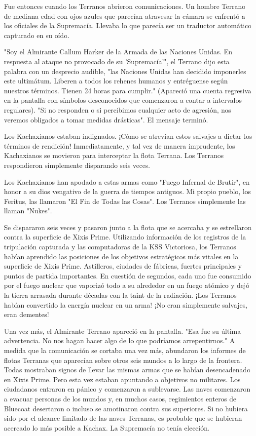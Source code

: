 \documentclass[spanish,12pt,a4paper,oneside,titlepage, twocolumn]{article}
\begin{document}
    Fue entonces cuando los Terranos abrieron comunicaciones. Un hombre Terrano de mediana edad con ojos azules que parecían atravesar la cámara se enfrentó a los oficiales de la Supremacía. Llevaba lo que parecía ser un traductor automático capturado en su oído.

    "Soy el Almirante Callum Harker de la Armada de las Naciones Unidas. En respuesta al ataque no provocado de su 'Supremacía'", el Terrano dijo esta palabra con un desprecio audible, "las Naciones Unidas han decidido imponerles este ultimátum. Liberen a todos los rehenes humanos y entréguense según nuestros términos. Tienen 24 horas para cumplir." (Apareció una cuenta regresiva en la pantalla con símbolos desconocidos que comenzaron a contar a intervalos regulares). "Si no responden o si percibimos cualquier acto de agresión, nos veremos obligados a tomar medidas drásticas". El mensaje terminó.

    Los Kachaxianos estaban indignados. ¡Cómo se atrevían estos salvajes a dictar los términos de rendición! Inmediatamente, y tal vez de manera imprudente, los Kachaxianos se movieron para interceptar la flota Terrana. Los Terranos respondieron simplemente disparando seis veces.

    Los Kachaxianos han apodado a estas armas como "Fuego Infernal de Brutir", en honor a su dios vengativo de la guerra de tiempos antiguos. Mi propio pueblo, los Feritus, las llamaron "El Fin de Todas las Cosas". Los Terranos simplemente las llaman "Nukes".

    Se dispararon seis veces y pasaron junto a la flota que se acercaba y se estrellaron contra la superficie de Xixis Prime. Utilizando información de los registros de la tripulación capturada y las computadoras de la KSS Victoriosa, los Terranos habían aprendido las posiciones de los objetivos estratégicos más vitales en la superficie de Xixis Prime. Astilleros, ciudades de fábricas, fuertes principales y puntos de partida importantes. En cuestión de segundos, cada uno fue consumido por el fuego nuclear que vaporizó todo a su alrededor en un fuego atómico y dejó la tierra arrasada durante décadas con la taint de la radiación. ¡Los Terranos habían convertido la energía nuclear en un arma! ¡No eran simplemente salvajes, eran dementes!

    Una vez más, el Almirante Terrano apareció en la pantalla. "Esa fue su última advertencia. No nos hagan hacer algo de lo que podríamos arrepentirnos." A medida que la comunicación se cortaba una vez más, abundaron los informes de flotas Terranas que aparecían sobre otros seis mundos a lo largo de la frontera. Todas mostraban signos de llevar las mismas armas que se habían desencadenado en Xixis Prime. Pero esta vez estaban apuntando a objetivos no militares. Los ciudadanos entraron en pánico y comenzaron a sublevarse. Las naves comenzaron a evacuar personas de los mundos y, en muchos casos, regimientos enteros de Bluecoat desertaron o incluso se amotinaron contra sus superiores. Si no hubiera sido por el alcance limitado de las naves Terranas, es probable que se hubieran acercado lo más posible a Kachax. La Supremacía no tenía elección.
\end{document}
